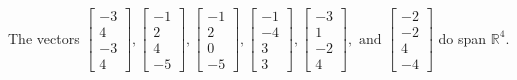 \begin{exercise}
\begin{exerciseStatement}
  \end{exerciseStatement}
  \begin{exerciseAnswer}
   The vectors \(\left[\begin{array}{r}
-3 \\
4 \\
-3 \\
4
\end{array}\right] , \left[\begin{array}{r}
-1 \\
2 \\
4 \\
-5
\end{array}\right] , \left[\begin{array}{r}
-1 \\
2 \\
0 \\
-5
\end{array}\right] , \left[\begin{array}{r}
-1 \\
-4 \\
3 \\
3
\end{array}\right] , \left[\begin{array}{r}
-3 \\
1 \\
-2 \\
4
\end{array}\right] , \text{ and } \left[\begin{array}{r}
-2 \\
-2 \\
4 \\
-4
\end{array}\right]\) 
  	 do  
	span \(\mathbb{R}^4\).
  


  \end{exerciseAnswer}
\end{exercise}